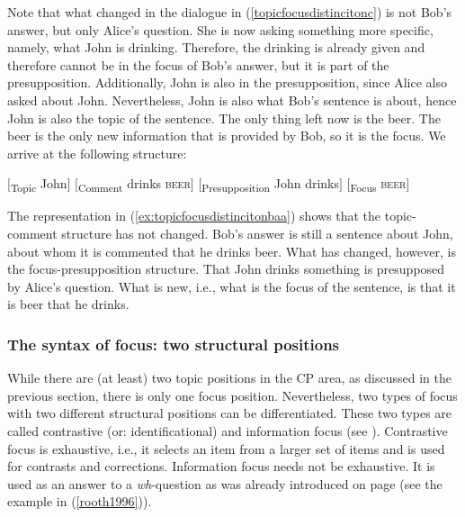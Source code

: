 \noindent Note that what changed in the dialogue in (\ref{topicfocusdistincitonc}) is not Bob's answer, but only Alice's question. She is now asking something more specific, namely, what John is drinking. Therefore, the drinking is already given and therefore cannot be in the focus of Bob's answer, but it is part of the presupposition. Additionally, John is also in the presupposition, since Alice also asked about John. Nevertheless, John is also what Bob's sentence is about, hence John is also the topic of the sentence. The only thing left now is the beer. The beer is the only new information that is provided by Bob, so it is the focus. We arrive at the following structure:

\begin{exe}
\ex\label{topicfocusdistincitond}\begin{xlist} 
\ex $[$\textsubscript{Topic} John$]$ $[$\textsubscript{Comment} drinks \textsc{beer}$]$ \label{ex:topicfocusdistincitonbaa}
\ex $[$\textsubscript{Presupposition} John drinks$]$ $[$\textsubscript{Focus} \textsc{beer}$]$ \label{ex:topicfocusdistincitonbbb}
\end{xlist}
\end{exe}

\noindent The representation in (\ref{ex:topicfocusdistincitonbaa}) shows that the topic-comment structure has not changed. Bob's answer is still a sentence about John, about whom it is commented that he drinks beer. What has changed, however, is the focus-presupposition structure. That John drinks something is presupposed by Alice's question. What is new, i.e., what is the focus of the sentence, is that it is beer that he drinks. 

\subsubsection{The syntax of focus: two structural positions}
While there are (at least) two topic positions in the CP area, as discussed in the previous section, there is only one focus position. Nevertheless, two types of focus with two different structural positions can be differentiated. These two types are called contrastive (or: identificational) and information focus (see \citealt{kiss1981structural}). Contrastive focus is exhaustive, i.e., it selects an item from a larger set of items and is used for contrasts and corrections. Information focus needs not be exhaustive. It is used as an answer to a \textit{wh}-question as was already introduced on page \pageref{rooth1996} (see the example in (\ref{rooth1996})). 

